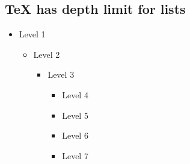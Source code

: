 
\subsection*{TeX has depth limit for lists}
\begin{itemize}
\item Level 1
  \begin{itemize}
  \item Level 2
    \begin{itemize}
    \item Level 3
      \begin{itemize}
      \item Level 4
      \item Level 5
      \item Level 6
      \item Level 7
      \end{itemize}
    \end{itemize}
  \end{itemize}
\end{itemize}

